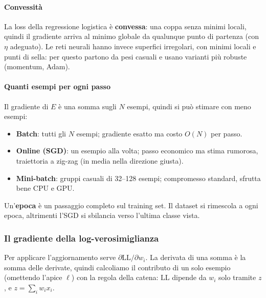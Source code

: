 \documentclass[12pt]{extarticle}
\begin{document}
\paragraph{Convessità}
La loss della regressione logistica è \textbf{convessa}: una coppa senza minimi locali, quindi il gradiente arriva al minimo globale da qualunque punto di partenza (con $\eta$ adeguato). Le reti neurali hanno invece superfici irregolari, con minimi locali e punti di sella: per questo partono da pesi casuali e usano varianti più robuste (momentum, Adam).

\paragraph{Quanti esempi per ogni passo}
Il gradiente di $E$ è una somma sugli $N$ esempi, quindi si può stimare con meno esempi:
\begin{itemize}
    \item \textbf{Batch}: tutti gli $N$ esempi; gradiente esatto ma costo $O(N)$ per passo.
    \item \textbf{Online (SGD)}: un esempio alla volta; passo economico ma stima rumorosa, traiettoria a zig-zag (in media nella direzione giusta).
    \item \textbf{Mini-batch}: gruppi casuali di 32--128 esempi; compromesso standard, sfrutta bene CPU e GPU.
\end{itemize}
Un'\textbf{epoca} è un passaggio completo sul training set. Il dataset si rimescola a ogni epoca, altrimenti l'SGD si sbilancia verso l'ultima classe vista.

\subsubsection{Il gradiente della log-verosimiglianza}

\noindent Per applicare l'aggiornamento serve $\partial\mathrm{LL}/\partial w_i$. La derivata di una somma è la somma delle derivate, quindi calcoliamo il contributo di un solo esempio (omettendo l'apice $\ell$) con la regola della catena: $\mathrm{LL}$ dipende da $w_i$ solo tramite $z$, e $z=\sum_i w_i x_i$.
\end{document}
